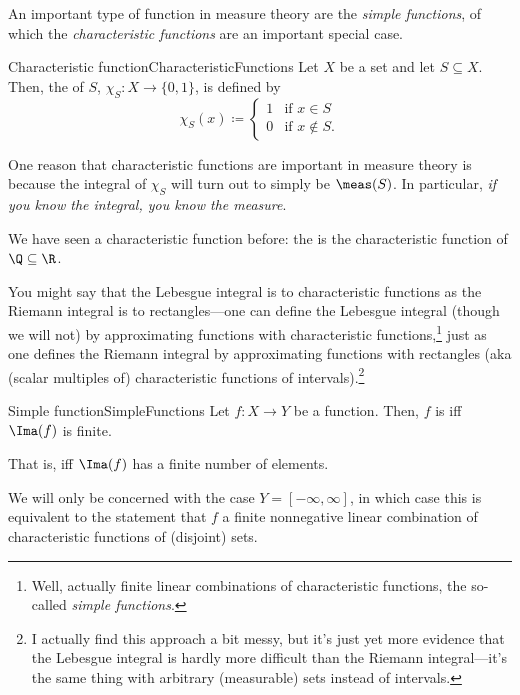 An important type of function in measure theory are the \emph{simple functions}, of which the \emph{characteristic functions} are an important special case.
\begin{dfn}{Characteristic function}{CharacteristicFunctions}
Let $X$ be a set and let $S\subseteq X$.  Then, the  of $S$, $\chi _S:X\rightarrow \{ 0,1\}$, is defined by
\begin{equation}
\chi _S(x)\coloneqq \begin{cases}1 & \text{if }x\in S \\ 0 & \text{if }x\notin S.\end{cases}
\end{equation}
\begin{rmk}
One reason that characteristic functions are important in measure theory is because the integral of $\chi _S$ will turn out to simply be $\meas (S)$.  In particular, \emph{if you know the integral, you know the measure}.
\end{rmk}
\begin{rmk}
We have seen a characteristic function before:  the  is the characteristic function of $\Q \subseteq \R$.
\end{rmk}
\begin{rmk}
You might say that the Lebesgue integral is to characteristic functions as the Riemann integral is to rectangles---one can define the Lebesgue integral (though we will not) by approximating functions with characteristic functions,\footnote{Well, actually finite linear combinations of characteristic functions, the so-called \emph{simple functions}.} just as one defines the Riemann integral by approximating functions with rectangles (aka (scalar multiples of) characteristic functions of intervals).\footnote{I actually find this approach a bit messy, but it's just yet more evidence that the Lebesgue integral is hardly more difficult than the Riemann integral---it's the same thing with arbitrary (measurable) sets instead of intervals.}
\end{rmk}
\end{dfn}
\begin{dfn}{Simple function}{SimpleFunctions}
Let $f\colon X\rightarrow Y$ be a function.  Then, $f$ is  iff $\Ima (f)$ is finite.
\begin{rmk}
That is, iff $\Ima (f)$ has a finite number of elements.
\end{rmk}
\begin{rmk}
We will only be concerned with the case $Y=[-\infty ,\infty ]$, in which case this is equivalent to the statement that $f$ a finite nonnegative linear combination of characteristic functions of (disjoint) sets.
\end{rmk}
\end{dfn}

